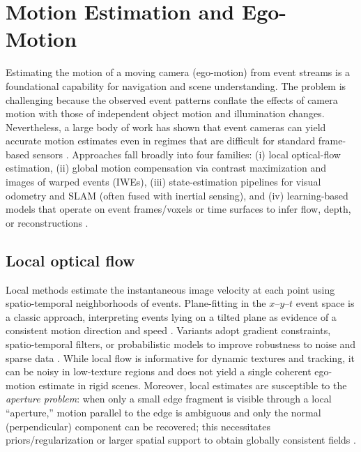 \section{Motion Estimation and Ego-Motion}
\label{sec:ego-motion}

Estimating the motion of a moving camera (ego-motion) from event streams is a foundational capability for navigation and scene understanding. The problem is challenging because the observed event patterns conflate the effects of camera motion with those of independent object motion and illumination changes. Nevertheless, a large body of work has shown that event cameras can yield accurate motion estimates even in regimes that are difficult for standard frame-based sensors \cite{Gallego2020Survey}. Approaches fall broadly into four families: (i) local optical-flow estimation, (ii) global motion compensation via contrast maximization and images of warped events (IWEs), (iii) state-estimation pipelines for visual odometry and SLAM (often fused with inertial sensing), and (iv) learning-based models that operate on event frames/voxels or time surfaces to infer flow, depth, or reconstructions \cite{Bardow2016SOFIE,Gallego2018CMax,Rebecq2017EVO,Rebecq2019E2VID,Zhu2019Unsupervised,Rebecq2019,Gallego2020Survey}.

\subsection{Local optical flow}
Local methods estimate the instantaneous image velocity at each point using spatio-temporal neighborhoods of events. Plane-fitting in the $x$–$y$–$t$ event space is a classic approach, interpreting events lying on a tilted plane as evidence of a consistent motion direction and speed \cite{Benosman2014Epipolar}. Variants adopt gradient constraints, spatio-temporal filters, or probabilistic models to improve robustness to noise and sparse data \cite{Gallego2020Survey}. While local flow is informative for dynamic textures and tracking, it can be noisy in low-texture regions and does not yield a single coherent ego-motion estimate in rigid scenes. Moreover, local estimates are susceptible to the \emph{aperture problem}: when only a small edge fragment is visible through a local ``aperture,'' motion parallel to the edge is ambiguous and only the normal (perpendicular) component can be recovered; this necessitates priors/regularization or larger spatial support to obtain globally consistent fields \cite{Gallego2020Survey}.


